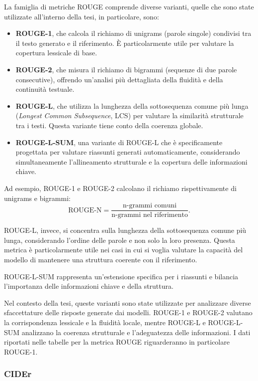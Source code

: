 \documentclass[../main.tex]{subfiles}
\begin{document}
La famiglia di metriche ROUGE comprende diverse varianti, quelle che sono state utilizzate all'interno della tesi, in particolare, sono:

\begin{itemize}
    \item \textbf{ROUGE-1}, che calcola il richiamo di unigrams (parole singole) condivisi tra il testo generato e il riferimento. È particolarmente utile per valutare la copertura lessicale di base.
    \item \textbf{ROUGE-2}, che misura il richiamo di bigrammi (sequenze di due parole consecutive), offrendo un'analisi più dettagliata della fluidità e della continuità testuale.
    \item \textbf{ROUGE-L}, che utilizza la lunghezza della sottosequenza comune più lunga (\textit{Longest Common Subsequence}, LCS) per valutare la similarità strutturale tra i testi. Questa variante tiene conto della coerenza globale.
    \item \textbf{ROUGE-L-SUM}, una variante di ROUGE-L che è specificamente progettata per valutare riassunti generati automaticamente, considerando simultaneamente l'allineamento strutturale e la copertura delle informazioni chiave.
\end{itemize}

Ad esempio, ROUGE-1 e ROUGE-2 calcolano il richiamo rispettivamente di unigrams e bigrammi:
\[
\text{ROUGE-N} = \frac{\text{n-grammi comuni}}{\text{n-grammi nel riferimento}}.
\]

ROUGE-L, invece, si concentra sulla lunghezza della sottosequenza comune più lunga, considerando l'ordine delle parole e non solo la loro presenza. Questa metrica è particolarmente utile nei casi in cui si voglia valutare la capacità del modello di mantenere una struttura coerente con il riferimento.

ROUGE-L-SUM rappresenta un'estensione specifica per i riassunti e bilancia l'importanza delle informazioni chiave e della struttura.

Nel contesto della tesi, queste varianti sono state utilizzate per analizzare diverse sfaccettature delle risposte generate dai modelli. ROUGE-1 e ROUGE-2 valutano la corrispondenza lessicale e la fluidità locale, mentre ROUGE-L e ROUGE-L-SUM analizzano la coerenza strutturale e l'adeguatezza delle informazioni. I dati riportati nelle tabelle per la metrica ROUGE riguarderanno in particolare ROUGE-1.

\subsubsection{CIDEr}
\end{document}
